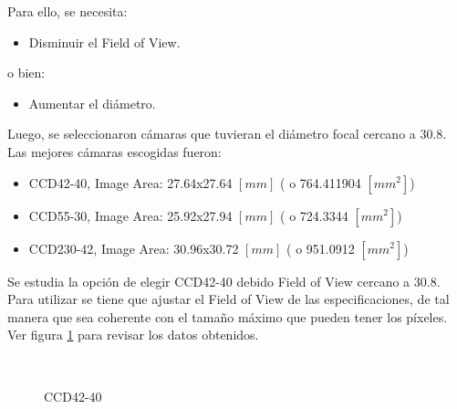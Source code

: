 \documentclass[a4paper,10pt]{article}
\begin{document}
Para ello, se necesita:
\begin{itemize}
\item Disminuir el Field of View.
\end{itemize}
o bien:
\begin{itemize}
\item Aumentar el diámetro.
\end{itemize}

Luego, se seleccionaron cámaras que tuvieran el diámetro focal cercano a 30.8.
Las mejores cámaras escogidas fueron:
\begin{itemize}
\item CCD42-40,  Image Area: 27.64x27.64 $[mm]$ ( o 764.411904 $[mm^2]$)
\item CCD55-30,  Image Area: 25.92x27.94 $[mm]$ ( o 724.3344   $[mm^2]$)
\item CCD230-42, Image Area: 30.96x30.72 $[mm]$ ( o 951.0912   $[mm^2]$)
\end{itemize}
Se estudia la opción de elegir CCD42-40 debido Field of View cercano a 30.8.
Para utilizar se tiene que ajustar el Field of View de las especificaciones, de
tal manera que sea coherente con el tamaño máximo que pueden tener los píxeles.
Ver figura \ref{fig:ccd42p2} para revisar los datos obtenidos.
\begin{figure}[ht!]
  \centering
  ~ 
  ~ 
  \caption{CCD42-40}
  \label{fig:ccd42p2}
\end{figure}
\end{document}
